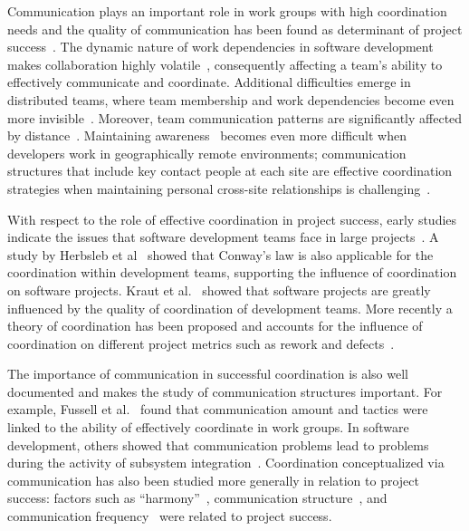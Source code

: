 Communication plays an important role in work groups with high coordination needs
and the quality of communication has been found as determinant of project
success~\cite{curtis:acm:1988,kraut:1995coordination}. The dynamic nature
of work dependencies in software development makes collaboration highly
volatile~\cite{Cataldo:2007hb}, consequently affecting a team's ability to
effectively communicate and coordinate. Additional difficulties emerge in
distributed teams, where team membership and work dependencies become even more
invisible~\cite{damian:icgse:2007}. Moreover, team communication patterns are
significantly affected by distance~\cite{hinds:cscw:2006}. Maintaining
awareness~\cite{sarma:2006icgse} becomes even more difficult when developers work
in geographically remote environments; communication structures that include key
contact people at each site are effective coordination strategies when
maintaining personal cross-site relationships is challenging~\cite{hinds:cscw:2006}.

With respect to the role of effective coordination in project success, early
studies indicate the issues that software development teams face in large
projects~\cite{curtis:acm:1988}. A study by Herbsleb et
al~\cite{Herbsleb:1999ew} showed that Conway's law is also applicable for the
coordination within development teams, supporting the influence of coordination
on software projects. Kraut et al.~\cite{kraut:1995coordination} showed that
software projects are greatly influenced by the quality of coordination of
development teams. More recently a theory of coordination has been proposed and
accounts for the influence of coordination on different project metrics such as
rework and defects~\cite{Herbsleb:2006vn}.

The importance of communication in successful coordination is also well
documented and makes the study of communication structures important. For
example, Fussell et al.~\cite{fussell:cscw:1998} found that communication amount and
tactics were linked to the ability of effectively coordinate in work groups. In
software development, others showed that communication problems lead to problems
during the activity of subsystem
integration~\cite{Grinter:1999geography,deSouza2004:thwarts_collaboration}. Coordination
conceptualized via communication has also been studied more generally in relation
to project success: factors such as ``harmony''~\cite{Souder:1988jpim},
communication structure~\cite{Robin:1990jpim}, and communication
frequency~\cite{Griffin:1992ms} were related to project success.

